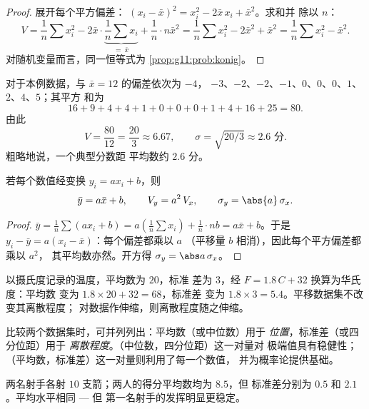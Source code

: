 \begin{proof}
展开每个平方偏差：
$(x_i - \bar x)^2 = x_i^2 - 2\bar x\, x_i + \bar x^2$。求和并
除以 $n$：
\[
V = \frac1n \sum x_i^2 - 2\bar x \cdot \underbrace{\frac1n \sum
x_i}_{=\ \bar x} + \frac1n \cdot n\bar x^2
= \frac1n\sum x_i^2 - 2\bar x^2 + \bar x^2
= \frac1n\sum x_i^2 - \bar x^2 .
\]
对随机变量而言，同一恒等式为
\cref{prop:g11:prob:konig}。
\end{proof}

\begin{example}\label{ex:g11:stat:variance}
对于本例数据，与 $\bar x = 12$ 的偏差依次为 $-4$，
$-3$、$-2$、$-2$、$-1$、$0$、$0$、$0$、$1$、$2$、$4$、$5$；其平方
和为
\[
16 + 9 + 4 + 4 + 1 + 0 + 0 + 0 + 1 + 4 + 16 + 25 = 80 .
\]
由此
\[
V = \frac{80}{12} = \frac{20}{3} \approx 6.67,
\qquad
\sigma = \sqrt{20/3} \approx 2.6 \text{ 分}.
\]
粗略地说，一个典型分数距
平均数约 $2.6$ 分。
\end{example}

\begin{proposition}[单位变换]\label{prop:g11:stat:affine}
若每个数值经变换 $y_i = a x_i + b$，则
\[
\bar y = a \bar x + b,
\qquad
V_y = a^2\, V_x,
\qquad
\sigma_y = \abs{a}\,\sigma_x .
\]
\end{proposition}

\begin{proof}
$\bar y = \frac1n \sum (a x_i + b) = a\left(\frac1n\sum x_i\right) +
\frac1n \cdot nb = a\bar x + b$。于是
$y_i - \bar y = a(x_i - \bar x)$：每个偏差都乘以 $a$
（平移量 $b$ 相消），因此每个平方偏差都乘以 $a^2$，
其平均数亦然。开方得
$\sigma_y = \abs a\,\sigma_x$。
\end{proof}

\begin{example}
以摄氏度记录的温度，平均数为 $20$，标准
差为 $3$，经 $F = 1.8\,C + 32$ 换算为华氏度：平均数
变为 $1.8 \times 20 + 32 = 68$，标准差
变为 $1.8 \times 3 = 5.4$。平移数据集不改变其离散程度；
对数据作伸缩，则离散程度随之伸缩。
\end{example}

\begin{method}[概括与比较数据集]\label{met:g11:stat:compare}
比较两个数据集时，可并列列出：平均数（或中位数）用于
\emph{位置}，标准差（或四分位距）用于
\emph{离散程度}。（中位数，四分位距）这一对量对
极端值具有稳健性；（平均数，标准差）这一对量则利用了每一个数值，
并为概率论提供基础。
\end{method}

\begin{example}
两名射手各射 $10$ 支箭；两人的得分平均数均为 $8.5$，但
标准差分别为 $0.5$ 和 $2.1$。平均水平相同 --- 但
第一名射手的发挥明显更稳定。
\end{example}

